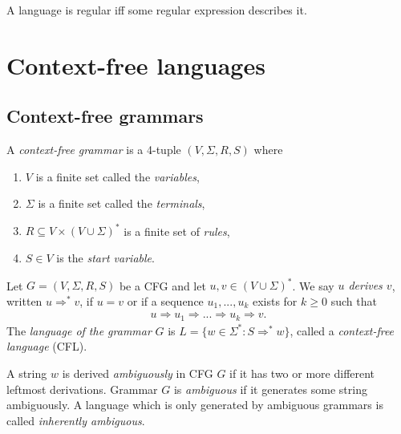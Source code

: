 \documentclass{article}
\begin{document}
\begin{theorem*}[Sipser p. 66]
	A language is regular iff some regular expression describes it.
\end{theorem*}

\section{Context-free languages}

\subsection{Context-free grammars}

\begin{definition*}
	A \emph{context-free grammar} is a 4-tuple $(V,\Sigma,R,S)$ where
	\begin{enumerate}
		\item $V$ is a finite set called the \emph{variables},
		\item $\Sigma$ is a finite set called the \emph{terminals},
		\item $R\subseteq V\times(V\cup\Sigma)^*$ is a finite set of \emph{rules},
		\item $S\in V$ is the \emph{start variable}.
	\end{enumerate}
\end{definition*}

\begin{definition*}
	Let $G=(V,\Sigma,R,S)$ be a CFG and let $u,v\in(V\cup\Sigma)^*$.
	We say \emph{$u$ derives $v$}, written $u\Rightarrow^* v$, if $u=v$ or if a sequence
	$u_1,...,u_k$ exists for $k\geq 0$ such that
	\begin{align*}
		u\Rightarrow u_1 \Rightarrow ... \Rightarrow u_k \Rightarrow v.
	\end{align*}
	The \emph{language of the grammar} $G$ is $L=\{w\in\Sigma^*:S\Rightarrow^* w\}$,
	called a \emph{context-free language} (CFL).
\end{definition*}

\begin{definition*}
	A string $w$ is derived \emph{ambiguously} in CFG $G$ if it has
	two or more different leftmost derivations. Grammar $G$ is \emph{ambiguous} if it
	generates some string ambiguously.
	A language which is only generated by ambiguous grammars is called \emph{inherently
		ambiguous}.
\end{definition*}
\end{document}
